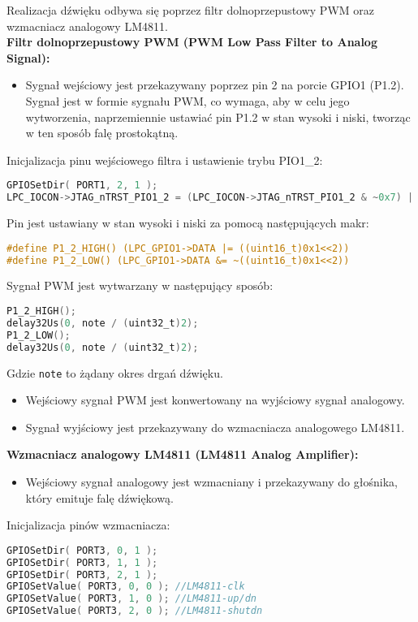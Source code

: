 \documentclass[a4paper,12pt]{report}
\begin{document}
Realizacja dźwięku odbywa się poprzez filtr dolnoprzepustowy PWM oraz wzmacniacz analogowy LM4811.\\

\textbf{Filtr dolnoprzepustowy PWM (PWM Low Pass Filter to Analog Signal):}
\begin{itemize}
    \item Sygnał wejściowy jest przekazywany poprzez pin 2 na porcie GPIO1 (P1.2). Sygnał jest w formie sygnału PWM, co wymaga, aby w celu jego wytworzenia, naprzemiennie ustawiać pin P1.2 w stan wysoki i niski, tworząc w ten sposób falę prostokątną.
\end{itemize}

Inicjalizacja pinu wejściowego filtra i ustawienie trybu PIO1\_2:
\begin{lstlisting}[language=C]
GPIOSetDir( PORT1, 2, 1 );
LPC_IOCON->JTAG_nTRST_PIO1_2 = (LPC_IOCON->JTAG_nTRST_PIO1_2 & ~0x7) | 0x01;
\end{lstlisting}

Pin jest ustawiany w stan wysoki i niski za pomocą następujących makr:
\begin{lstlisting}[language=C]
#define P1_2_HIGH() (LPC_GPIO1->DATA |= ((uint16_t)0x1<<2))
#define P1_2_LOW() (LPC_GPIO1->DATA &= ~((uint16_t)0x1<<2))
\end{lstlisting}

Sygnał PWM jest wytwarzany w następujący sposób:
\begin{lstlisting}[language=C]
P1_2_HIGH();
delay32Us(0, note / (uint32_t)2);
P1_2_LOW();
delay32Us(0, note / (uint32_t)2);
\end{lstlisting}

Gdzie \texttt{note} to żądany okres drgań dźwięku.
\begin{itemize}
    \item Wejściowy sygnał PWM jest konwertowany na wyjściowy sygnał analogowy.
    \item Sygnał wyjściowy jest przekazywany do wzmacniacza analogowego LM4811.
\end{itemize}

\textbf{Wzmacniacz analogowy LM4811 (LM4811 Analog Amplifier):}
\begin{itemize}
    \item Wejściowy sygnał analogowy jest wzmacniany i przekazywany do głośnika, który emituje falę dźwiękową.
\end{itemize}

Inicjalizacja pinów wzmacniacza:
\begin{lstlisting}[language=C]
GPIOSetDir( PORT3, 0, 1 );
GPIOSetDir( PORT3, 1, 1 );
GPIOSetDir( PORT3, 2, 1 );
GPIOSetValue( PORT3, 0, 0 ); //LM4811-clk
GPIOSetValue( PORT3, 1, 0 ); //LM4811-up/dn
GPIOSetValue( PORT3, 2, 0 ); //LM4811-shutdn
\end{lstlisting}
\end{document}
